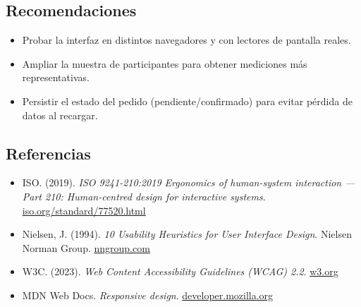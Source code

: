 \documentclass{article}
\begin{document}
\subsection{Recomendaciones}
\begin{itemize}
    \item Probar la interfaz en distintos navegadores y con lectores de pantalla reales.
    \item Ampliar la muestra de participantes para obtener mediciones más representativas.
    \item Persistir el estado del pedido (pendiente/confirmado) para evitar pérdida de datos al recargar.
\end{itemize}

\subsection{Referencias}
\begin{itemize}
    \item ISO. (2019). \textit{ISO 9241-210:2019 Ergonomics of human-system interaction — Part 210: Human-centred design for interactive systems}. \href{https://www.iso.org/standard/77520.html}{iso.org/standard/77520.html}
    \item Nielsen, J. (1994). \textit{10 Usability Heuristics for User Interface Design}. Nielsen Norman Group. \href{https://www.nngroup.com/articles/ten-usability-heuristics/}{nngroup.com}
    \item W3C. (2023). \textit{Web Content Accessibility Guidelines (WCAG) 2.2}. \href{https://www.w3.org/TR/WCAG22/}{w3.org}
    \item MDN Web Docs. \textit{Responsive design}. \href{https://developer.mozilla.org/en-US/docs/Learn/CSS/CSS_layout/Responsive_Design}{developer.mozilla.org}
\end{itemize}

\vspace{-3em}
% 
% 
\end{document}
